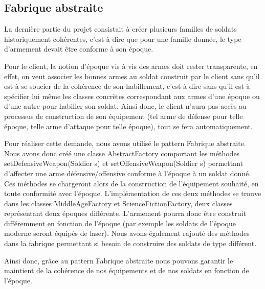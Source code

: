 \subsection{Fabrique abstraite}
La dernière partie du projet consistait à créer plusieurs familles de soldats historiquement cohérentes, c'est à dire que pour une famille donnée, le type d'armement devait être conforme à son époque.

Pour le client, la notion d'époque vis à vis des armes doit rester transparente, en effet, on veut associer les bonnes armes au soldat construit par le client sans qu'il est à se soucier de la cohérence de son habillement, c'est à dire sans qu'il est à spécifier lui même les classes concrètes correspondant aux armes d'une époque ou d'une autre pour habiller son soldat. Ainsi donc, le client n'aura pas accès au processus de construction de son équipement (tel arme de défense pour telle époque, telle arme d'attaque pour telle époque), tout se fera automatiquement.

Pour réaliser cette demande, nous avons utilisé le pattern Fabrique abstraite. Nous avons donc créé une classe AbstractFactory comportant les méthodes setDefensiveWeapon(Soldier s) et setOffensiveWeapon(Soldier s) permettant d'affecter une arme défensive/offensive conforme à l'époque à un soldat donné. Ces méthodes se chargeront alors de la construction de l'équipement souhaité, en toute conformité avec l'époque. L'implémentation de ces deux méthodes se trouve dans les classes MiddleAgeFactory et ScienceFictionFactory, deux classes représentant deux époques différente. L'armement pourra donc être construit différemment en fonction de l'époque (par exemple les soldats de l'époque moderne seront équipés de laser).
Nous avons également rajouté des méthodes dans la fabrique permettant si besoin de construire des soldats de type différent.

Ainsi donc, grâce au pattern Fabrique abstraite nous pouvons garantir le maintient de la cohérence de nos équipements et de nos soldats en fonction de l'époque.